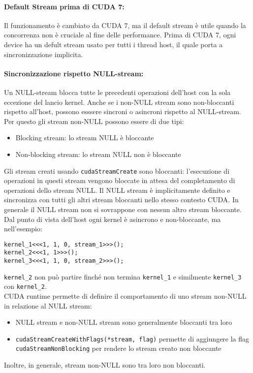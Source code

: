 \paragraph{Default Stream prima di CUDA 7:} Il funzionamento è cambiato da CUDA 7, ma il default stream è utile quando la concorrenza non è cruciale al fine delle performance. Prima di CUDA 7, ogni device ha un defult stream usato per tutti i thread host, il quale porta a sincronizzazione implicita.\\

\paragraph{Sincronizzazione rispetto NULL-stream:} Un NULL-stream blocca tutte le precedenti operazioni dell'host con la sola eccezione del lancio kernel. Anche se i non-NULL stream sono non-bloccanti rispetto all'host, possono esssere sincroni o asincroni rispetto al NULL-stream. \\

Per questo gli stream non-NULL possono essere di due tipi: 
\begin{itemize}
	\item Blocking stream: lo stream NULL è bloccante
	\item Non-blocking stream: lo stream NULL non è bloccante
\end{itemize}

Gli stream creati usando \texttt{cudaStreamCreate} sono bloccanti: l'esecuzione di operazioni in questi stream vengono bloccate in attesa del completamento di operazioni dello stream NULL.  Il NULL stream è implicitamente definito e sincronizza con tutti gli altri stream bloccanti nello stesso contesto CUDA. In generale il NULL stream non si sovrappone con nessun altro stream bloccante.\\

Dal punto di vista dell'host ogni kernel è asincrono e non-bloccante, ma nell'esempio: 
\begin{verbatim}
kernel_1<<<1, 1, 0, stream_1>>>();
kernel_2<<<1, 1>>>();
kernel_3<<<1, 1, 0, stream_2>>>();
\end{verbatim}
\texttt{kernel\_2} non può partire finché non termina \texttt{kernel\_1} e similmente \texttt{kernel\_3} con \texttt{kernel\_2}.\\

CUDA runtime permette di definire il comportamento di uno stream non-NULL in relazione al NULL stream:
\begin{itemize}
	\item NULL stream e non-NULL stream sono generalmente bloccanti tra loro
	\item \texttt{cudaStreamCreateWithFlags(*stream, flag)} permette di aggiungere la flag \texttt{cudaStreamNonBlocking} per rendere lo stream creato non bloccante
\end{itemize}
Inoltre, in generale, stream non-NULL sono tra loro non bloccanti.\\

